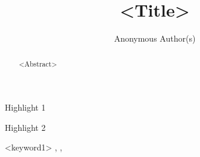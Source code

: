 \documentclass[preprint,12pt]{elsarticle}
\begin{document}
\begin{frontmatter}

\title{<Title>}

\author{Anonymous Author(s)}

\begin{abstract}
<Abstract>
\end{abstract}

\begin{graphicalabstract}
\end{graphicalabstract}

\begin{highlights}
\item Highlight 1
\item Highlight 2
\end{highlights}

\begin{keyword}
<keyword1> \sep <keyword2> \sep <keyword3>
\end{keyword}

\end{frontmatter}








\appendix



\nocite{*}

\end{document}
